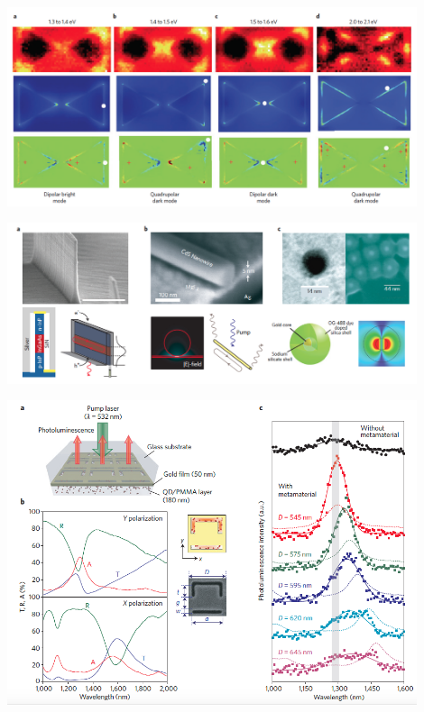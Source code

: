 \documentclass[9pt, compress, xcolor=table]{beamer}
\begin{document}
\begin{frame}{}
\begin{center}
\includegraphics[width=0.9\textwidth]{am5}
\end{center}
\end{frame}

\begin{frame}{}
\begin{center}
\includegraphics[width=0.9\textwidth]{am6}
\end{center}
\end{frame}

\begin{frame}{}
\begin{center}
\includegraphics[width=0.9\textwidth]{am7}
\end{center}
\end{frame}
\end{document}
